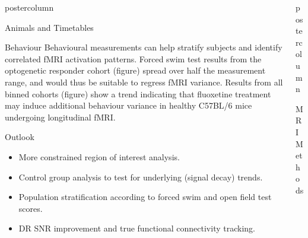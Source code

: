\documentclass{beamer}
\newlength{\columnheight}
\begin{document}
\begin{frame}
\begin{columns}
\begin{column}{.43\textwidth}
\begin{beamercolorbox}[center]{postercolumn}
\begin{minipage}{.98\textwidth}
{\begin{myblock}{Animals and Timetables}
						\vspace{0.5em}
						\vspace{-1em}
					\end{myblock}\vfill
					\vspace{-0.3em}
					\begin{myblock}{Behaviour}
						Behavioural measurements can help stratify subjects and identify correlated fMRI activation patterns.
						Forced swim test results from the optogenetic responder cohort (figure) spread over half the measurement range, and would thus be suitable to regress fMRI variance.
						Results from all binned cohorts (figure) show a trend indicating that fluoxetine treatment may induce additional behaviour variance in healthy C57BL/6 mice undergoing longitudinal fMRI.
						\vspace{0.4em}
						\vspace{-1em}
					\end{myblock}\vfill
					\vspace{-0.3em}
					\begin{myblock}{Outlook}
						\begin{itemize}
							\item More constrained region of interest analysis.
							\item Control group analysis to test for underlying (signal decay) trends.
							\item Population stratification according to forced swim and open field test scores.
							\item DR SNR improvement and true functional connectivity tracking.
						\end{itemize}
					\end{myblock}\vfill
		}\end{minipage}\end{beamercolorbox}
	\end{column}
	\begin{column}{.57\textwidth}
		\begin{beamercolorbox}[center]{postercolumn}
			\begin{minipage}{.98\textwidth} %
				\parbox[t][\columnheight]{\textwidth}{ %
					\begin{myblock}{MRI Methods}
						\vspace{0.5em}
						\begin{center}
							\begin{minipage}{.37\textwidth}

\end{minipage}
\end{center}
\end{myblock}}
\end{minipage}
\end{beamercolorbox}
\end{column}
\end{columns}
\end{frame}
\end{document}

